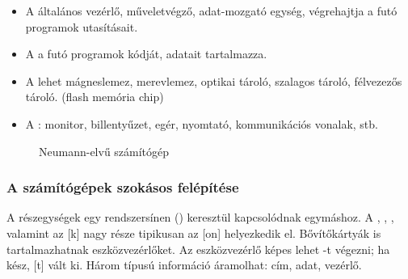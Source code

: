 \documentclass[../main.tex]{subfiles}
\begin{document}
\begin{itemize}
  \item A 
        általános vezérlő, műveletvégző, adat-mozgató egység,
        végrehajtja a futó programok utasításait.

  \item A 
        a futó programok kódját, adatait tartalmazza.

  \item A 
        lehet mágneslemez, merevlemez, optikai tároló,
        szalagos tároló, félvezezős tároló.
        (flash memória chip)

  \item A :
        monitor, billentyűzet, egér,
        nyomtató, kommunikációs vonalak, stb.
\end{itemize}
\begin{figure}[H]
  \centering
  \caption{Neumann-elvű számítógép}
  \label{fig:neumann}
\end{figure}

\subsubsection{A számítógépek szokásos felépítése}

A részegységek egy rendszersínen () keresztül kapcsolódnak
egymáshoz. A , , , valamint
az [k] nagy része tipikusan az [on] helyezkedik el.
Bővítőkártyák is tartalmazhatnak eszközvezérlőket.
Az eszközvezérlő képes lehet -t végezni; ha kész, [t]
vált ki. Három típusú információ áramolhat: cím, adat, vezérlő.
\end{document}
